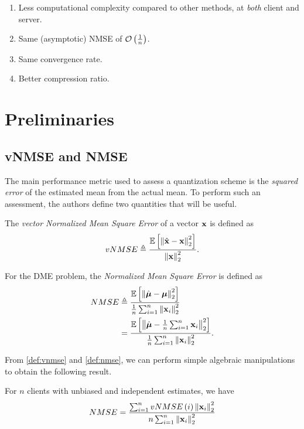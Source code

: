 \documentclass[journal,12pt,twocolumn]{IEEEtran}
\begin{document}
\begin{enumerate}
    \item Less computational complexity compared to other methods, at 
    \emph{both} client and server.
    \item Same (asymptotic) NMSE of \(\mathcal O\left(\frac{1}{n}\right)\).
    \item Same convergence rate.
    \item Better compression ratio.
\end{enumerate}

\section{Preliminaries}
\label{sec:prelims}
\subsection{vNMSE and NMSE}
\label{ssec:nmse}
The main performance metric used to assess a quantization scheme is the
\emph{squared error} of the estimated mean from the actual mean. To perform
such an assessment, the authors define two quantities that will be useful.
\begin{definition}[vNMSE]
    \label{def:vnmse}
    The \emph{vector Normalized Mean Square Error} of a vector \(\boldsymbol{\mathbf{x}}\)
    is defined as
    \begin{equation}
        vNMSE \triangleq \frac{\mathbb{E}\left[ \left\lVert\hat{\boldsymbol{\mathbf{x}}}-\boldsymbol{\mathbf{x}}\right\rVert^2_2 \right]}{\left\lVert\boldsymbol{\mathbf{x}}\right\rVert^2_2}.
        \label{eq:vnmse-def}
    \end{equation}
\end{definition}
\begin{definition}[NMSE]
    \label{def:nmse}
    For the DME problem, the \emph{Normalized Mean Square Error} is defined
    as
    \begin{align}
        NMSE &\triangleq \frac{\mathbb{E}\left[ \left\lVert\hat{\boldsymbol{\mathbf{\mu}}}-\boldsymbol{\mathbf{\mu}}\right\rVert^2_2 \right]}{\frac{1}{n}\sum_{i=1}^n\left\lVert\boldsymbol{\mathbf{x}}_i\right\rVert^2_2} \\
        &= \frac{\mathbb{E}\left[ \left\lVert\hat{\boldsymbol{\mathbf{\mu}}}-\frac{1}{n}\sum_{i=1}^n\boldsymbol{\mathbf{x}}_i\right\rVert^2_2 \right]}{\frac{1}{n}\sum_{i=1}^n\left\lVert\boldsymbol{\mathbf{x}}_i\right\rVert^2_2}.
        \label{eq:nmse-def}
    \end{align}
\end{definition}
From \autoref{def:vnmse} and \autoref{def:nmse}, we can perform simple 
algebraic manipulations to obtain the following result.
\begin{lemma}
    \label{lem:vnmse-nmse-rel}
    For \(n\) clients with unbiased and independent estimates, we have
    \cite{EDEN}
    \begin{equation}
        NMSE = \frac{\sum_{i=1}^nvNMSE\left(i\right)\left\lVert\boldsymbol{\mathbf{x}}_i\right\rVert_2^2}{n\sum_{i=1}^n\left\lVert\boldsymbol{\mathbf{x}}_i\right\rVert_2^2}
        \label{eq:vnmse-nmse-rel}
    \end{equation}
\end{lemma}
\end{document}
